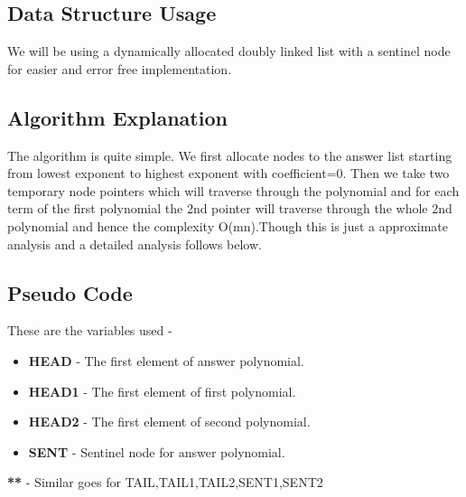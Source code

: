 \documentclass[20pt]{article}
\begin{document}
\subsection{Data Structure Usage}
We will be using a dynamically allocated doubly linked list with a sentinel node for easier and error free implementation.

\subsection{Algorithm Explanation}
The algorithm is quite simple. We first allocate nodes to the answer list starting from lowest exponent to highest exponent with coefficient=0. Then we take two temporary node pointers which will traverse through the polynomial and for each term of the first polynomial the 2nd pointer will traverse through the whole 2nd polynomial and hence the complexity {O(mn)}.Though this is just a approximate analysis and a detailed analysis follows below.

\subsection{Pseudo Code}
These are the variables used - 

\begin{itemize}
\item \textbf{HEAD}   - The first element of answer polynomial.
\item \textbf{HEAD1} - The first element of first polynomial.
\item \textbf{HEAD2} - The first element of second polynomial.
\item \textbf{SENT}   - Sentinel node for answer polynomial.
\end{itemize}
\textbf{**} - Similar goes for {TAIL,TAIL1,TAIL2,SENT1,SENT2}
\end{document}
